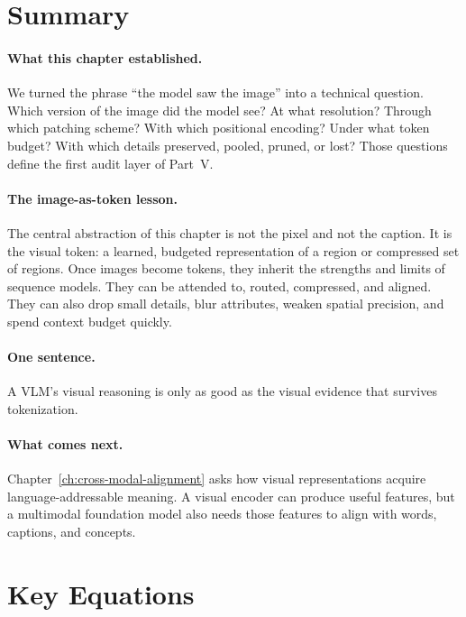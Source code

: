 \section*{Summary}

\paragraph{What this chapter established.} We turned the phrase ``the model saw the image'' into a technical question. Which version of the image did the model see? At what resolution? Through which patching scheme? With which positional encoding? Under what token budget? With which details preserved, pooled, pruned, or lost? Those questions define the first audit layer of Part~V.

\paragraph{The image-as-token lesson.} The central abstraction of this chapter is not the pixel and not the caption. It is the visual token: a learned, budgeted representation of a region or compressed set of regions. Once images become tokens, they inherit the strengths and limits of sequence models. They can be attended to, routed, compressed, and aligned. They can also drop small details, blur attributes, weaken spatial precision, and spend context budget quickly.

\paragraph{One sentence.} A VLM's visual reasoning is only as good as the visual evidence that survives tokenization.

\paragraph{What comes next.} Chapter~\ref{ch:cross-modal-alignment} asks how visual representations acquire language-addressable meaning. A visual encoder can produce useful features, but a multimodal foundation model also needs those features to align with words, captions, and concepts.

\section*{Key Equations}

